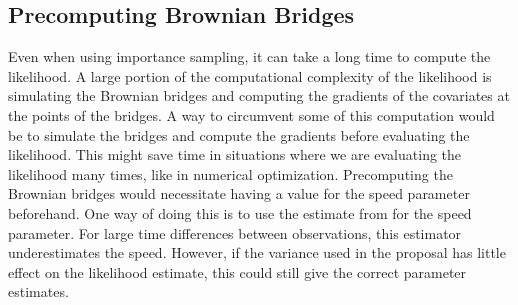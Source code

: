 \subsection{Precomputing Brownian Bridges}
\label{subsec: precomputing brownian bridges}
Even when using importance sampling, it can take a long time to compute the likelihood. A large portion of the computational complexity of the likelihood is simulating the Brownian bridges and computing the gradients of the covariates at the points of the bridges. A way to circumvent some of this computation would be to simulate the bridges and compute the gradients before evaluating the likelihood. This might save time in situations where we are evaluating the likelihood many times, like in numerical optimization. Precomputing the Brownian bridges would necessitate having a value for the speed parameter beforehand. One way of doing this is to use the estimate from \textcite{michelot_langevin_2019} for the speed parameter. For large time differences between observations, this estimator underestimates the speed. However, if the variance used in the proposal has little effect on the likelihood estimate, this could still give the correct parameter estimates. 













